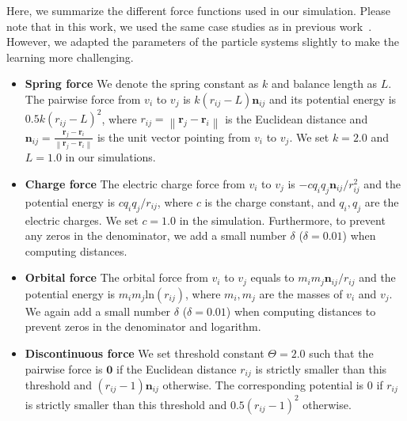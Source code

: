 \documentclass{article}
\newcommand{\norm}[1]{\left\lVert#1\right\rVert}
\begin{document}
Here, we summarize the different force functions used in our simulation. Please note that in this work, we used the same case studies as in previous work~\cite{cranmer2020discovering}. However, we adapted the parameters of the particle systems slightly to make the learning more challenging. 
\begin{itemize}
    \item \textbf{Spring force} We denote the spring constant as $k$ and balance length as $L$. The pairwise force from $v_i$ to $v_j$ is $k(r_{ij} - L)\bm{n}_{ij}$ and its potential energy is $0.5k(r_{ij} - L)^2$, where $r_{ij} = \norm{\bm{r}_j - \bm{r}_i}$ is the Euclidean distance and $\bm{n}_{ij}= \frac{\bm{r}_j - \bm{r}_i}{\norm{\bm{r}_j - \bm{r}_i}}$ is the unit vector pointing from $v_i$ to $v_j$. We set $k=2.0$ and $L=1.0$ in our simulations.
    \item \textbf{Charge force} The electric charge force from $v_i$ to $v_j$ is $-c q_i q_j \bm{n}_{ij} / r_{ij}^2$ and the potential energy is $c q_i q_j / r_{ij} $, where $c$ is the charge constant, and $q_i, q_j$ are the electric charges. We set $c=1.0$ in the simulation. Furthermore, to prevent any zeros in the denominator, we add a small number $\delta$ ($\delta=0.01$) when computing distances.
    \item \textbf{Orbital force} The orbital force from $v_i$ to $v_j$ equals to $m_i m_j\bm{n}_{ij}/r_{ij}$ and the potential energy is $m_i m_j \text{ln}(r_{ij})$, where $m_i, m_j$ are the masses of $v_i$ and $v_j$. We again add a small number $\delta$ ($\delta=0.01$) when computing distances to prevent zeros in the denominator and logarithm.
    \item \textbf{Discontinuous force} We set threshold constant $\Theta  =2.0$ such that the pairwise force is $\bm{0}$ if the Euclidean distance $r_{ij}$ is strictly smaller than this threshold and $(r_{ij} - 1)\bm{n}_{ij}$ otherwise. The corresponding potential is 0 if $r_{ij}$ is strictly smaller than this threshold and $0.5(r_{ij} - 1)^2$ otherwise. 
\end{itemize}
\end{document}
